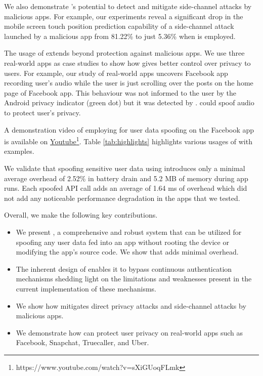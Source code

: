 We also demonstrate \framework{}'s potential to detect and mitigate side-channel attacks by malicious apps. For example, our experiments reveal a significant drop in the mobile screen touch position prediction capability of a side-channel attack launched by a malicious app from 81.22\% to just 5.36\% when \framework{} is employed. 

The usage of \framework{} extends beyond protection against malicious apps. We use three real-world apps as case studies to show how \framework{} gives better control over privacy to users. For example, our study of real-world apps uncovers Facebook app recording user's audio while the user is just scrolling over the posts on the home page of Facebook app. This behaviour was not informed to the user by the Android privacy indicator (green dot) but it was detected by \framework{}. \framework{} could spoof audio to protect user's privacy. 

A demonstration video of employing \framework{} for user data spoofing on the Facebook app is available on \href{https://www.youtube.com/watch?v=sXiGUoqFLmk}{Youtube}\footnote{https://www.youtube.com/watch?v=sXiGUoqFLmk}. Table \ref{tab:highlights} highlights various usages of \framework{} with examples.

We validate that spoofing sensitive user data using \framework{} introduces only a minimal average overhead of 2.52\% in battery drain and 5.2 MB of memory during app runs. Each spoofed API call adds an average of 1.64 ms of overhead which did not add any noticeable performance degradation in the apps that we tested.

Overall, we make the following key contributions.

\begin{itemize}
    \item We present \framework{}, a comprehensive and robust system that can be utilized for spoofing any user data fed into an app without rooting the device or modifying the app's source code. We show that \framework{} adds minimal overhead.
    \item The inherent design of \framework{} enables it to bypass continuous authentication mechanisms shedding light on the limitations and weaknesses present in the current implementation of these mechanisms. 
    \item We show how \framework{} mitigates direct privacy attacks and side-channel attacks by malicious apps.
    \item We demonstrate how \framework{} can protect user privacy on real-world apps such as Facebook, Snapchat, Truecaller, and Uber. 
\end{itemize}

